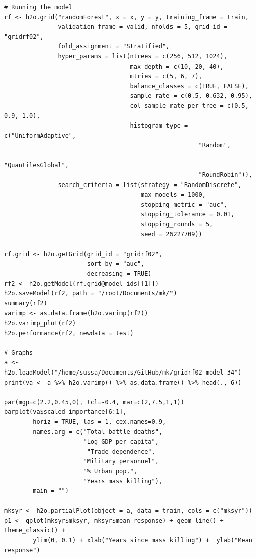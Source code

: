 \begin{verbatim}
# Running the model
rf <- h2o.grid("randomForest", x = x, y = y, training_frame = train, 
               validation_frame = valid, nfolds = 5, grid_id = "gridrf02",
               fold_assignment = "Stratified",
               hyper_params = list(ntrees = c(256, 512, 1024),
                                   max_depth = c(10, 20, 40),
                                   mtries = c(5, 6, 7),
                                   balance_classes = c(TRUE, FALSE),
                                   sample_rate = c(0.5, 0.632, 0.95),
                                   col_sample_rate_per_tree = c(0.5, 0.9, 1.0),
                                   histogram_type = c("UniformAdaptive",
                                                      "Random",
                                                      "QuantilesGlobal",
                                                      "RoundRobin")),
               search_criteria = list(strategy = "RandomDiscrete", 
                                      max_models = 1000, 
                                      stopping_metric = "auc", 
                                      stopping_tolerance = 0.01, 
                                      stopping_rounds = 5, 
                                      seed = 26227709)) 

rf.grid <- h2o.getGrid(grid_id = "gridrf02",
                       sort_by = "auc",
                       decreasing = TRUE)
rf2 <- h2o.getModel(rf.grid@model_ids[[1]])
h2o.saveModel(rf2, path = "/root/Documents/mk/")
summary(rf2)
varimp <- as.data.frame(h2o.varimp(rf2))
h2o.varimp_plot(rf2)
h2o.performance(rf2, newdata = test)

# Graphs
a <- h2o.loadModel("/home/sussa/Documents/GitHub/mk/gridrf02_model_34")
print(va <- a %>% h2o.varimp() %>% as.data.frame() %>% head(., 6)) 

par(mgp=c(2.2,0.45,0), tcl=-0.4, mar=c(2,7.5,1,1))
barplot(va$scaled_importance[6:1],
        horiz = TRUE, las = 1, cex.names=0.9,
        names.arg = c("Total battle deaths", 
                      "Log GDP per capita",
                       "Trade dependence",
                      "Military personnel",
                      "% Urban pop.",
                      "Years mass killing"),
        main = "")
        
mksyr <- h2o.partialPlot(object = a, data = train, cols = c("mksyr"))
p1 <- qplot(mksyr$mksyr, mksyr$mean_response) + geom_line() + theme_classic() + 
        ylim(0, 0.1) + xlab("Years since mass killing") +  ylab("Mean response")


\end{verbatim}
